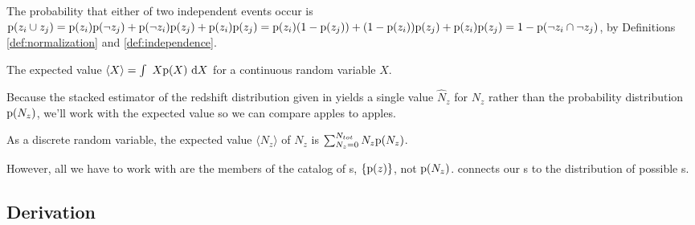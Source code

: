 \begin{proposition}\label{prp:union}
	The probability that either of two independent events occur is $\mathrm{p}(z_{i} \cup z_{j}) = \mathrm{p}(z_{i}) \mathrm{p}(\lnot z_{j}) + \mathrm{p}(\lnot z_{i}) \mathrm{p}(z_{j}) + \mathrm{p}(z_{i}) \mathrm{p}(z_{j}) = \mathrm{p}(z_{i}) (1 - \mathrm{p}(z_{j})) + (1 - \mathrm{p}(z_{i})) \mathrm{p}(z_{j}) + \mathrm{p}(z_{i}) \mathrm{p}(z_{j}) = 1 - \mathrm{p}(\lnot z_{i} \cap \lnot z_{j})$, by Definitions \ref{def:normalization} and \ref{def:independence}.
\end{proposition}



\begin{definition}\label{def:expected}
	The expected value $\langle X \rangle = \int\ X\mathrm{p}(X)\ \mathrm{d} X$ for a continuous random variable $X$.
\end{definition}

Because the stacked estimator of the redshift distribution given in  yields a single value $\hat{N}_{z}$ for $N_{z}$ rather than the probability distribution $\mathrm{p}(N_{z})$, we'll work with the expected value so we can compare apples to apples.

\begin{lemma}\label{lem:expectednz}
	As a discrete random variable, the expected value $\langle N_{z} \rangle$ of $N_{z}$ is $\sum_{N_{z} = 0}^{N_{tot}} N_{z}\mathrm{p}(N_{z})$.
\end{lemma}

However, all we have to work with are the members of the catalog of \pzpdf s, $\{\mathrm{p}(z)\}$, not $\mathrm{p}(N_{z})$.
 connects our \pzpdf s to the distribution of possible \Nz s.

\subsection{Derivation}

